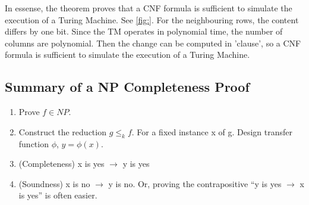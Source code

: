\begin{itemize}
In essense, the theorem proves that a CNF formula is sufficient to simulate the execution of a Turing Machine. See \ref{fig:}. For the neighbouring rows, the content differs by one bit. Since the TM operates in polynomial time, the number of columns are polynomial. Then the change can be computed in 'clause', so a CNF formula is sufficient to simulate the execution of a Turing Machine.
\end{itemize}




\subsection{Summary of a NP Completeness Proof}
\begin{enumerate}
    \item Prove $f \in NP$.
    \item Construct the reduction $g \leq _k f$.
    For a fixed instance x of g. Design transfer function $\phi$, $y=\phi(x)$.
    \item (Completeness) x is yes $\rightarrow$ y is yes
    \item (Soundness) x is no $\rightarrow$ y is no. 
    Or, proving the contrapositive “y is yes $\rightarrow$ x is yes” is often easier.
\end{enumerate}    
